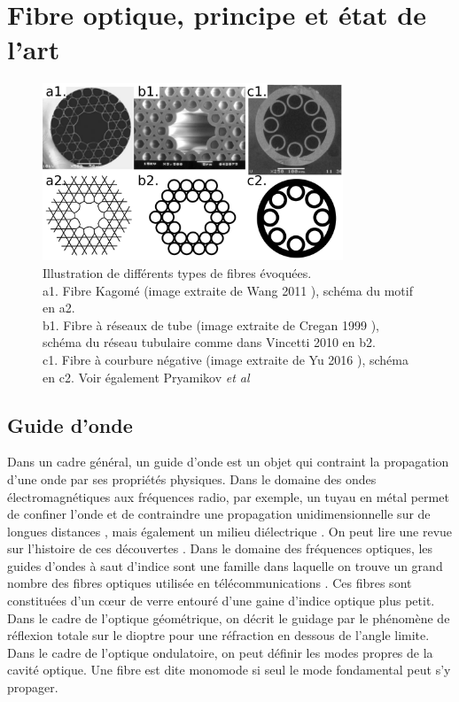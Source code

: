 \section{Fibre optique, principe et état de l'art}

\begin{figure}
\centering
\includegraphics[width=0.8\textwidth]{./files/fibers.svg.png}
\caption{Illustration de différents types de fibres évoquées.
\\ a1. Fibre Kagomé (image extraite de Wang 2011 \cite{wang_low_2011}), schéma du motif en a2.
\\ b1. Fibre à réseaux de tube (image extraite de Cregan 1999 \cite{cregan_single-mode_1999}), schéma du réseau tubulaire comme dans Vincetti 2010 \cite{vincetti_waveguiding_2010} en b2.
\\ c1. Fibre à courbure négative (image extraite de Yu 2016 \cite{yu_negative_2016}), schéma en c2. Voir également Pryamikov \emph{et al} \cite{pryamikov_demonstration_2011}}
\end{figure}

\subsection{Guide d'onde}

Dans un cadre général, un guide d'onde est un objet qui contraint la propagation d'une onde par ses propriétés physiques. Dans le domaine des ondes électromagnétiques aux fréquences radio, par exemple, un tuyau en métal permet de confiner l'onde et de contraindre une propagation unidimensionnelle sur de longues distances \cite{miller_low-loss_1953}, mais également un milieu diélectrique \cite{unger_circular_1957}. On peut lire une revue sur l'histoire de ces découvertes \cite{packard_origin_1984}.
Dans le domaine des fréquences optiques, les guides d'ondes à saut d'indice sont une famille dans laquelle on trouve un grand nombre des fibres optiques utilisée en télécommunications \cite{maurer_glass_1973}. Ces fibres sont constituées d'un cœur de verre entouré d'une gaine d'indice optique plus petit. Dans le cadre de l'optique géométrique, on décrit le guidage par le phénomène de réflexion totale sur le dioptre pour une réfraction en dessous de l'angle limite. Dans le cadre de l'optique ondulatoire, on peut définir les modes propres de la cavité optique. Une fibre est dite monomode si seul le mode fondamental peut s'y propager.

